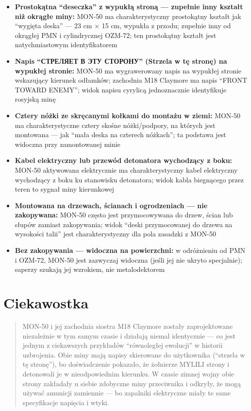 \documentclass[12pt,openany,oneside]{book}
\providecommand{\tightlist}{%
  \setlength{\itemsep}{0pt}\setlength{\parskip}{0pt}}
\begin{document}
\begin{itemize}
\tightlist
\item
  \textbf{Prostokątna ``deseczka'' z wypukłą stroną --- zupełnie inny
  kształt niż okrągłe miny:} MON-50 ma charakterystyczny prostokątny
  kształt jak ``wygięta deska'' --- 23 cm × 15 cm, wypukła z przodu;
  zupełnie inny od okrągłej PMN i cylindrycznej OZM-72; ten prostokątny
  kształt jest natychmiastowym identyfikatorem
\item
  \textbf{Napis ``СТРЕЛЯЕТ В ЭТУ СТОРОНУ'' (Strzela w tę stronę) na
  wypukłej stronie:} MON-50 ma wygrawerowany napis na wypukłej stronie
  wskazujący kierunek odłamków; zachodnia M18 Claymore ma napis ``FRONT
  TOWARD ENEMY''; widok napisu cyrylicą jednoznacznie identyfikuje
  rosyjską minę
\item
  \textbf{Cztery nóżki ze skręcanymi kołkami do montażu w ziemi:} MON-50
  ma charakterystyczne cztery skośne nóżki/podpory, na których jest
  montowana --- jak ``mała deska na czterech nóżkach''; ta podstawa jest
  widoczna przy zamontowanej minie
\item
  \textbf{Kabel elektryczny lub przewód detonatora wychodzący z boku:}
  MON-50 aktywowana elektrycznie ma charakterystyczny kabel elektryczny
  wychodzący z boku ku stanowisku detonatora; widok kabla biegnącego
  przez teren to sygnał miny kierunkowej
\item
  \textbf{Montowana na drzewach, ścianach i ogrodzeniach --- nie
  zakopywana:} MON-50 często jest przymocowywana do drzew, ścian lub
  słupów zamiast zakopywania; widok ``deski przymocowanej do drzewa na
  wysokości talii'' jest charakterystyczny dla pola zasadzki z MON-50
\item
  \textbf{Bez zakopywania --- widoczna na powierzchni:} w odróżnieniu od
  PMN i OZM-72, MON-50 jest zazwyczaj widoczna (jeśli jej nie ukryto
  specjalnie); saperzy szukają jej wzrokiem, nie metalodektorem
\end{itemize}

\section{Ciekawostka}\label{ciekawostka-112}

\begin{quote}
MON-50 i jej zachodnia siostra M18 Claymore zostały zaprojektowane
niezależnie w tym samym czasie i działają niemal identycznie --- co jest
jednym z ciekawszych przykładów ``równoległej ewolucji'' w historii
uzbrojenia. Obie miny mają napisy skierowane do użytkownika (``strzela w
tę stronę''), bo doświadczenie pokazało, że żołnierze MYLILI strony i
detonowali je w nieodpowiednim kierunku. W czasie zimnej wojny obie
strony zakładały u siebie zdobyczne miny przeciwnika i odkryły, że mogą
używać amunicji zamiennie --- bo zapalniki elektryczne miały te same
specyfikacje napięcia i wtyki.
\end{quote}
\end{document}
